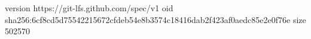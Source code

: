 version https://git-lfs.github.com/spec/v1
oid sha256:6cf8cd5d75542215672cfdeb54e8b3574c18416dab2f423af0aedc85e2e0f76e
size 502570
